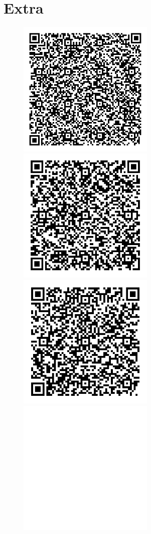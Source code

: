 \documentclass[12pt]{article}
\begin{document}
	\section{Extra}
	\begin{figure}[h]
		\centering
		\includegraphics[width=65mm]{imagens/pablo.jpg}
		\includegraphics[width=65mm]{imagens/marco.jpg}
		\includegraphics[width=65mm]{imagens/lucas.jpg}
		\includegraphics[width=65mm]{imagens/blank.jpg}
	\end{figure}
\end{document}
